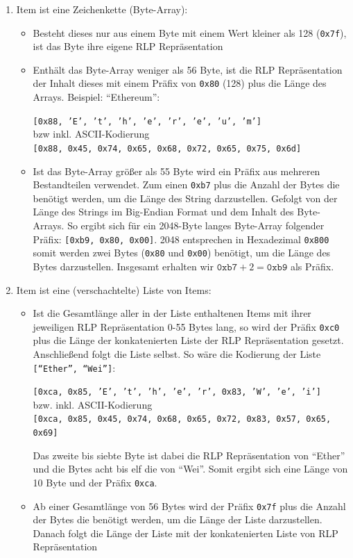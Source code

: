 \documentclass[runningheads]{llncs}
\begin{document}
\begin{enumerate}
  \item Item ist eine Zeichenkette (Byte-Array):
        \begin{itemize}
          \item Besteht dieses nur aus einem Byte mit einem Wert kleiner als 128 (\texttt{0x7f}), ist das Byte ihre eigene RLP Repräsentation
          \item Enthält das Byte-Array weniger als 56 Byte, ist die RLP Repräsentation der Inhalt dieses mit einem Präfix von \texttt{0x80} (128) plus die Länge des Arrays. Beispiel: "`Ethereum"':
                \begin{center}
                  \texttt{[0x88, 'E', 't', 'h', 'e', 'r', 'e', 'u', 'm']}\\
                  bzw inkl. ASCII-Kodierung\\
                  \texttt{[0x88, 0x45, 0x74, 0x65, 0x68, 0x72, 0x65, 0x75, 0x6d]}
                \end{center}
          \item Ist das Byte-Array größer als 55 Byte wird ein Präfix aus mehreren Bestandteilen verwendet. Zum einen \texttt{0xb7} plus die Anzahl der Bytes die benötigt werden, um die Länge des String darzustellen. Gefolgt von der Länge des Strings im Big-Endian Format und dem Inhalt des Byte-Arrays. So ergibt sich für ein 2048-Byte langes Byte-Array folgender Präfix: \texttt{[0xb9, 0x80, 0x00]}.
                2048 entsprechen in Hexadezimal \texttt{0x800} somit werden zwei Bytes (\texttt{0x80} und \texttt{0x00}) benötigt, um die Länge des Bytes darzustellen. Insgesamt erhalten wir $\texttt{0xb7} + 2 = \texttt{0xb9}$ als Präfix.
        \end{itemize}
  \item Item ist eine (verschachtelte) Liste von Items:
        \begin{itemize}
          \item Ist die Gesamtlänge aller in der Liste enthaltenen Items mit ihrer jeweiligen RLP Repräsentation 0-55 Bytes lang, so wird der Präfix \texttt{0xc0} plus die Länge der konkatenierten Liste der RLP Repräsentation gesetzt. Anschließend folgt die Liste selbst. So wäre die Kodierung der Liste \texttt{["`Ether"', "`Wei"']}:
                \begin{center}
                  \texttt{[0xca, 0x85, 'E', 't', 'h', 'e', 'r', 0x83, 'W', 'e', 'i']}\\
                  bzw. inkl. ASCII-Kodierung\\
                  \texttt{[0xca, 0x85, 0x45, 0x74, 0x68, 0x65, 0x72, 0x83, 0x57, 0x65, 0x69]}
                \end{center}
                Das zweite bis siebte Byte ist dabei die RLP Repräsentation von "`Ether"' und die Bytes acht bis elf die von "`Wei"'. Somit ergibt sich eine Länge von 10 Byte und der Präfix \verb+0xca+.
          \item Ab einer Gesamtlänge von 56 Bytes wird der Präfix \texttt{0x7f} plus die Anzahl der Bytes die benötigt werden, um die Länge der Liste darzustellen. Danach folgt die Länge der Liste mit der konkatenierten Liste von RLP Repräsentation
        \end{itemize}
\end{enumerate}
\end{document}
